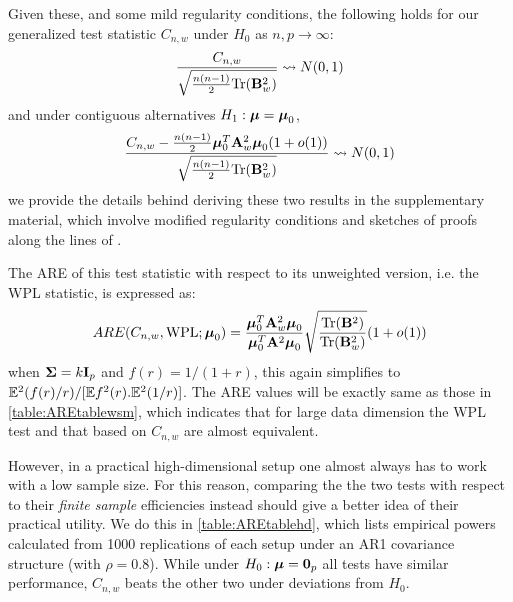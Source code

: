 Given these, and some mild regularity conditions, the following holds for our generalized test statistic $C_{n,w}$ under $H_0$ as $n,p \rightarrow \infty$:
%
\begin{equation}\label{eqn:hdtest1}
\frac{C_{n,w}}{\sqrt{\frac{n(n-1)}{2} \text{Tr}({\mathbf{B}}_w^2)}} \leadsto N(0,1)
\end{equation}
%
and under contiguous alternatives $H_1: {\boldsymbol{\mu}} = {\boldsymbol{\mu}}_0$,
%
\begin{equation}\label{eqn:hdtest2}
\frac{C_{n,w} - \frac{n(n-1)}{2} {\boldsymbol{\mu}}_0^T {\mathbf{A}}_w^2 {\boldsymbol{\mu}}_0 (1 + o(1)) }{\sqrt{\frac{n(n-1)}{2} \text{Tr}({\mathbf{B}}_w^2)}} \leadsto N(0,1)
\end{equation}
%
we provide the details behind deriving these two results in the supplementary material, which involve modified regularity conditions and sketches of proofs along the lines of \cite{WangPengLi15}.

The ARE of this test statistic with respect to its unweighted version, i.e. the WPL statistic, is expressed as:
%
$$
ARE(C_{n,w}, \text{WPL}; {\boldsymbol{\mu}}_0) = \frac{{\boldsymbol{\mu}}_0^T {\mathbf{A}}_w^2 {\boldsymbol{\mu}}_0}{{\boldsymbol{\mu}}_0^T {\mathbf{A}}^2 {\boldsymbol{\mu}}_0} \sqrt\frac{\text{Tr}({\mathbf{B}}^2)}{\text{Tr}({\mathbf{B}}_w^2)} (1 + o(1))
$$
%
when ${\boldsymbol{\Sigma}} = k{\mathbf{I}}_p$ and $f(r) = 1/(1+r)$, this again simplifies to ${\mathbb{E}}^2(f(r)/r)/[{\mathbb{E}} f^2(r). {\mathbb{E}}^2(1/r)]$. The ARE values will be exactly same as those in \ref{table:AREtablewsm}, which indicates that for large data dimension the WPL test and that based on $C_{n,w}$ are almost equivalent.

However, in a practical high-dimensional setup one almost always has to work with a low sample size. For this reason, comparing the the two tests with respect to their \textit{finite sample} efficiencies instead should give a better idea of their practical utility. We do this in \ref{table:AREtablehd}, which lists empirical powers calculated from 1000 replications of each setup under an AR1 covariance structure (with $\rho = 0.8$). While under $H_0: {\boldsymbol{\mu}} = {\bf 0}_p$ all tests have similar performance, $C_{n,w}$ beats the other two under deviations from $H_0$.

